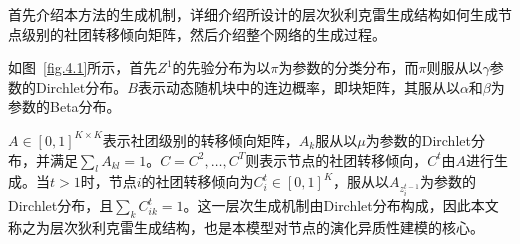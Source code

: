



首先介绍本方法的生成机制，详细介绍所设计的层次狄利克雷生成结构如何生成节点级别的社团转移倾向矩阵，然后介绍整个网络的生成过程。


如图~\ref{fig.4.1}所示，首先$Z^1$的先验分布为以$\pi$为参数的分类分布，而$\pi$则服从以$\gamma$参数的Dirchlet分布。$B$表示动态随机块中的连边概率，即块矩阵，其服从以$\alpha$和$\beta$为参数的Beta分布。

$A \in [0, 1]^{K \times K}$表示社团级别的转移倾向矩阵，$A_k$服从以$\mu$为参数的Dirchlet分布，并满足$\sum_l A_{kl} = 1$。$C = { C^2, \dots, C^T }$则表示节点的社团转移倾向，$C^t$由$A$进行生成。当$t>1$时，节点$i$的社团转移倾向为$C_i^t \in [0, 1]^K$，服从以$A_{z_i^{t-1}}$为参数的Dirchlet分布，且$\sum_{k} C_{ik}^t = 1$。这一层次生成机制由Dirchlet分布构成，因此本文称之为层次狄利克雷生成结构，也是本模型对节点的演化异质性建模的核心。

